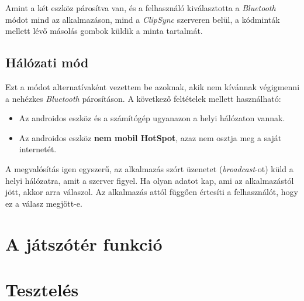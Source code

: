 \documentclass[12pt,a4paper]{article}
\begin{document}
	Amint a két eszköz párosítva van, és a felhasználó kiválasztotta a \textit{Bluetooth} módot mind az alkalmazáson, mind a \textit{ClipSync} szerveren belül, a kódminták mellett lévő másolás gombok küldik a minta tartalmát.
	
	\subsection{Hálózati mód}
	
	Ezt a módot alternatívaként vezettem be azoknak, akik nem kívánnak végigmenni a nehézkes \textit{Bluetooth} párosításon. A következő feltételek mellett használható:
	
	\begin{itemize}
		\item Az androidos eszköz és a számítógép ugyanazon a helyi hálózaton vannak.
		\item Az androidos eszköz \textbf{nem mobil HotSpot}, azaz nem osztja meg a saját internetét.
	\end{itemize}

	A megvalósítás igen egyszerű, az alkalmazás szórt üzenetet (\textit{broadcast}-ot) küld a helyi hálózatra, amit a szerver figyel. Ha olyan adatot kap, ami az alkalmazástól jött, akkor arra válaszol. Az alkalmazás attól függően értesíti a felhasználót, hogy ez a válasz megjött-e.  
	
	\section{A játszótér funkció}

	

	\section{Tesztelés}
\end{document}
